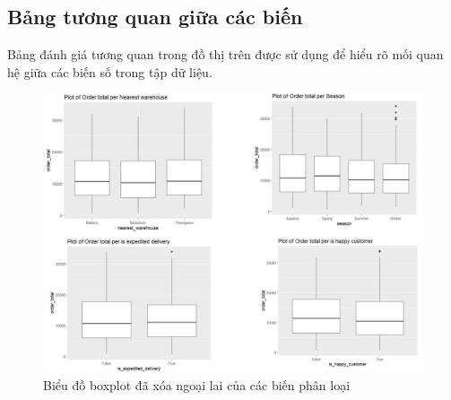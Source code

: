 \subsection{Bảng tương quan giữa các biến}
Bảng đánh giá tương quan trong đồ thị trên được sử dụng để hiểu rõ mối quan hệ giữa các biến số trong tập dữ liệu.
\pagebreak
\begin{figure}[!htbp]
    \centering
    \includegraphics[width=1\linewidth]{graphics/bang14.jpg}
    \caption{Biểu đồ boxplot đã xóa ngoại lai của các biến phân loại}
    \label{fig:4.8}
\end{figure}

